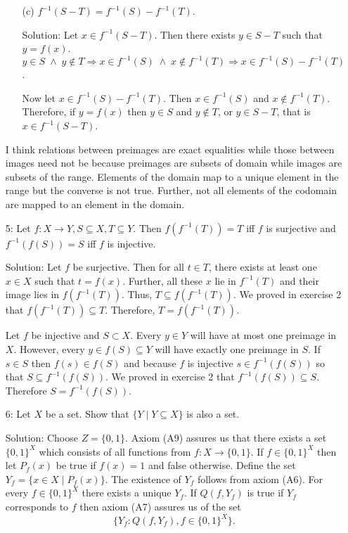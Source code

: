 \begin{enumerate}
\begin{enumerate}
\item[(c)] $f^{-1}(S - T) = f^{-1}(S) - f^{-1}(T)$.
\item[Solution:] Let $x \in f^{-1}(S - T)$. Then there exists $y \in S - T$
such that $y = f(x)$. $y \in S \;\land\; y \notin T \Rightarrow x \in
f^{-1}(S) \;\land\; x \notin f^{-1}(T) \Rightarrow x \in f^{-1}(S) - 
f^{-1}(T)$.

Now let $x \in f^{-1}(S) - f^{-1}(T)$. Then $x \in f^{-1}(S)$ and $x \notin
f^{-1}(T)$. Therefore, if $y = f(x)$ then $y \in S$ and $y \notin T$, or
$y \in S - T$, that is $x \in f^{-1}(S - T)$.
\end{enumerate}
I think relations between preimages are exact equalities while those 
between images need not be because preimages are subsets of domain while 
images are subsets of the range. Elements of the domain map to a unique 
element in the range but the converse is not true. Further, not all 
elements of the codomain are mapped to an element in the domain.

\item[5:] Let $f: X \rightarrow Y, S \subseteq X, T \subseteq Y$. Then
$f(f^{-1}(T)) = T$ iff $f$ is surjective and $f^{-1}(f(S)) = S$ iff $f$
is injective.
\item[Solution:] Let $f$ be surjective. Then for all $t \in T$, there 
exists at least one $x \in X$ such that $t = f(x)$. Further, all these
$x$ lie in $f^{-1}(T)$ and their image lies in $f(f^{-1}(T))$. Thus, $T
\subseteq f(f^{-1}(T))$. We proved in exercise 2 that $f(f^{-1}(T)) 
\subseteq T$. Therefore, $T = f(f^{-1}(T))$.

Let $f$ be injective and $S \subset X$. Every $y \in Y$ will have at most
one preimage in $X$. However, every $y \in f(S) \subseteq Y$ will have
exactly one preimage in $S$. If $s \in S$ then $f(s) \in f(S)$ and 
because $f$ is injective $s \in f^{-1}(f(S))$ so that $S \subseteq 
f^{-1}(f(S))$. We proved in exercise 2 that $f^{-1}(f(S)) \subseteq S$.
Therefore $S = f^{-1}(f(S))$.

\item[6:] Let $X$ be a set. Show that $\{Y \;|\; Y \subseteq X\}$ is
also a set.
\item[Solution:] Choose $Z = \{0, 1\}$. Axiom (A9) assures us that there
exists a set $\{0, 1\}^X$ which consists of all functions from $f: X 
\rightarrow \{0, 1\}$. If $f \in \{0, 1\}^X$ then let $P_f(x)$ be true if
$f(x) = 1$ and false otherwise. Define the set $Y_f = \{x \in X \;|\;
P_f(x)\}$. The existence of $Y_f$ follows from axiom (A6). For every $f \in
\{0, 1\}^X$ there exists a unique $Y_f$. If $Q(f, Y_f)$ is true if $Y_f$
corresponds to $f$ then axiom (A7) assures us of the set
\[
\{Y_f: Q(f, Y_f), f \in \{0, 1\}^X\}.
\]


\end{enumerate}
